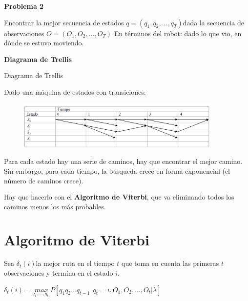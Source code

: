 \begin{caja}
	\textbf{Problema 2}
	
	
	Encontrar la mejor secuencia de estados \( q = (q_1, q_2 , \ldots, q_T)\)dada la secuencia de observaciones \( O = (O_1, O_2, \ldots, O_T)\)
	En términos del robot: dado lo que vio, en dónde se estuvo moviendo.
	
\end{caja}

\textbf{Diagrama de Trellis}

Diagrama de Trellis

Dado una máquina de estados con transiciones:

\begin{figure}[h!]
	\centering
	\includegraphics[width=0.9\textwidth]{images/img101.png}
	\label{figura101}
\end{figure}

Para cada estado hay una serie de caminos, hay que encontrar el mejor camino. Sin embargo, para cada
tiempo, la búsqueda crece en forma exponencial (el número de caminos crece).

Hay que hacerlo con el \textbf{Algoritmo de Viterbi}, que va eliminando todos los caminos menos los más
probables.

\section{Algoritmo de Viterbi}


Sea $\delta_t (i)$la mejor ruta en el tiempo $t$ que toma en cuenta las primeras $t$ observaciones y termina en el estado
$i$.

$\delta_t (i) = \underset{q_1, \ldots, q_{t1}}{max} P[q_1 q_2 \ldots q_{t-1}, q_t = i, O_1 , O_2, \ldots, O_t | \lambda]$

